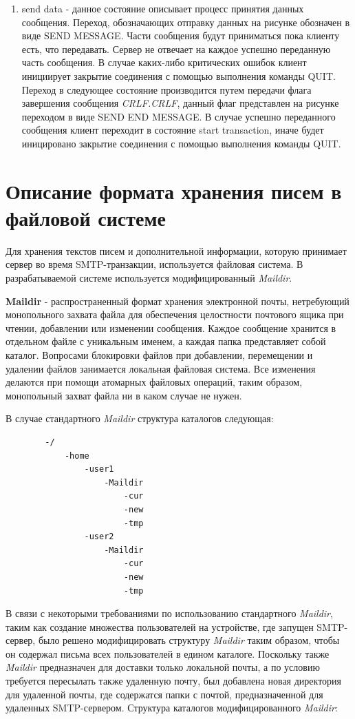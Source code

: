 \documentclass[a4paper,12pt]{report}
\begin{document}
\begin{enumerate}
		\item send data - данное состояние описывает процесс принятия данных сообщения. Переход, обозначающих отправку данных на рисунке обозначен в виде SEND MESSAGE. Части сообщения будут приниматься пока клиенту есть, что передавать. Сервер не отвечает на каждое успешно переданную часть сообщения. В случае каких-либо критических ошибок клиент инициирует закрытие соединения с помощью выполнения команды QUIT. Переход в следующее состояние производится путем передачи флага завершения сообщения \textit{CRLF.CRLF}, данный флаг представлен на рисунке переходом в виде SEND END MESSAGE. В случае успешно переданного сообщения клиент переходит в состояние start transaction, иначе будет иницировано закрытие соединения с помощью выполнения команды QUIT.
	\end{enumerate}

    	\section{Описание формата хранения писем в файловой системе}
    	
	Для хранения текстов писем и дополнительной информации, которую принимает сервер во время SMTP-транзакции, используется файловая система. В разрабатываемой системе используется модифицированный \textit{Maildir}.
	
	\textbf{Maildir} - распространенный формат хранения электронной почты, нетребующий монопольного захвата файла для обеспечения целостности почтового ящика при чтении, добавлении или изменении сообщения. Каждое сообщение хранится в отдельном файле с уникальным именем, а каждая папка представляет собой каталог. Вопросами блокировки файлов при добавлении, перемещении и удалении файлов занимается локальная файловая система. Все изменения делаются при помощи атомарных файловых операций, таким образом, монопольный захват файла ни в каком случае не нужен.

	В случае стандартного \textit{Maildir} структура каталогов следующая:
	\begin{Verbatim}
		-/
			-home
				-user1
					-Maildir
						-cur
						-new
						-tmp
				-user2
					-Maildir
						-cur
						-new
						-tmp

	\end{Verbatim}

	В связи с некоторыми требованиями по использованию стандартного \textit{Maildir}, таким как создание множества пользователей на устройстве, где запущен SMTP-сервер, было решено модифицировать структуру \textit{Maildir} таким образом, чтобы он содержал письма всех пользователей в едином каталоге. Поскольку также \textit{Maildir} предназначен для доставки только локальной почты, а по условию требуется пересылать также удаленную почту, был добавлена новая директория для удаленной почты, где содержатся папки с почтой, предназначенной для удаленных SMTP-сервером. Структура каталогов модифицированного \textit{Maildir}:
        
\end{document}
